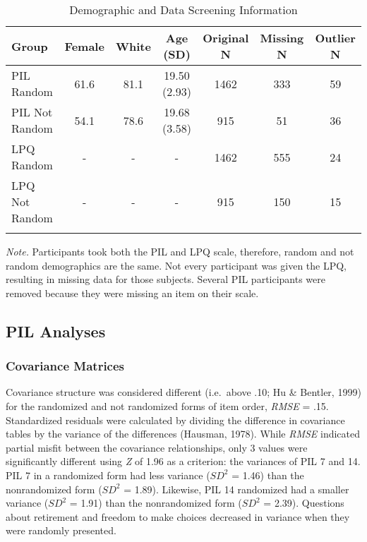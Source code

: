 \documentclass[english,man, mask]{apa6}
\theoremstyle{definition}
\theoremstyle{definition}
\theoremstyle{definition}
\theoremstyle{remark}
\begin{document}
\begin{table}[tbp]
\begin{center}
\begin{threeparttable}
\caption{\label{tab:demo-table}Demographic and Data Screening Information}
\begin{tabular}{lcccccc}
\toprule
Group & \multicolumn{1}{c}{Female} & \multicolumn{1}{c}{White} & \multicolumn{1}{c}{Age (SD)} & \multicolumn{1}{c}{Original N} & \multicolumn{1}{c}{Missing N} & \multicolumn{1}{c}{Outlier N}\\
\midrule
PIL Random & 61.6 & 81.1 & 19.50 (2.93) & 1462 & 333 & 59\\
PIL Not Random & 54.1 & 78.6 & 19.68 (3.58) & 915 & 51 & 36\\
LPQ Random & - & - & - & 1462 & 555 & 24\\
LPQ Not Random & - & - & - & 915 & 150 & 15\\
\bottomrule
\addlinespace
\end{tabular}
\begin{tablenotes}[para]
\textit{Note.} Participants took both the PIL and LPQ scale, therefore, random and not random demographics are the same. Not every participant was given the LPQ, resulting in missing data for those subjects. Several PIL participants were removed because they were missing an item on their scale.
\end{tablenotes}
\end{threeparttable}
\end{center}
\end{table}

\subsection{PIL Analyses}\label{pil-analyses}

\subsubsection{Covariance Matrices}\label{covariance-matrices}

Covariance structure was considered different (i.e.~above .10; Hu \&
Bentler, 1999) for the randomized and not randomized forms of item
order, \emph{RMSE} = .15. Standardized residuals were calculated by
dividing the difference in covariance tables by the variance of the
differences (Hausman, 1978). While \emph{RMSE} indicated partial misfit
between the covariance relationships, only 3 values were significantly
different using \emph{Z} of 1.96 as a criterion: the variances of PIL 7
and 14. PIL 7 in a randomized form had less variance (\(SD^2\) = 1.46)
than the nonrandomized form (\(SD^2\) = 1.89). Likewise, PIL 14
randomized had a smaller variance (\(SD^2\) = 1.91) than the
nonrandomized form (\(SD^2\) = 2.39). Questions about retirement and
freedom to make choices decreased in variance when they were randomly
presented.
\end{document}
